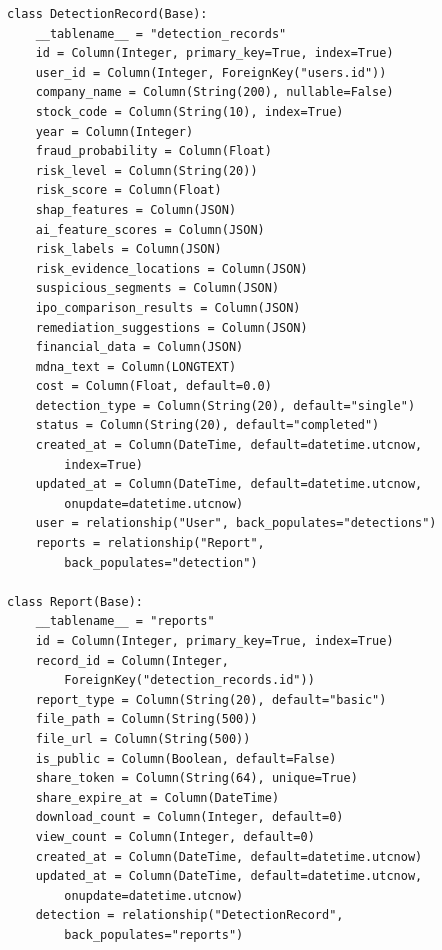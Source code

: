 \documentclass[a4paper,10pt]{article}
\begin{document}
\begin{lstlisting}
class DetectionRecord(Base):
    __tablename__ = "detection_records"
    id = Column(Integer, primary_key=True, index=True)
    user_id = Column(Integer, ForeignKey("users.id"))
    company_name = Column(String(200), nullable=False)
    stock_code = Column(String(10), index=True)
    year = Column(Integer)
    fraud_probability = Column(Float)
    risk_level = Column(String(20))
    risk_score = Column(Float)
    shap_features = Column(JSON)
    ai_feature_scores = Column(JSON)
    risk_labels = Column(JSON)
    risk_evidence_locations = Column(JSON)
    suspicious_segments = Column(JSON)
    ipo_comparison_results = Column(JSON)
    remediation_suggestions = Column(JSON)
    financial_data = Column(JSON)
    mdna_text = Column(LONGTEXT)
    cost = Column(Float, default=0.0)
    detection_type = Column(String(20), default="single")
    status = Column(String(20), default="completed")
    created_at = Column(DateTime, default=datetime.utcnow,
        index=True)
    updated_at = Column(DateTime, default=datetime.utcnow,
        onupdate=datetime.utcnow)
    user = relationship("User", back_populates="detections")
    reports = relationship("Report",
        back_populates="detection")

class Report(Base):
    __tablename__ = "reports"
    id = Column(Integer, primary_key=True, index=True)
    record_id = Column(Integer,
        ForeignKey("detection_records.id"))
    report_type = Column(String(20), default="basic")
    file_path = Column(String(500))
    file_url = Column(String(500))
    is_public = Column(Boolean, default=False)
    share_token = Column(String(64), unique=True)
    share_expire_at = Column(DateTime)
    download_count = Column(Integer, default=0)
    view_count = Column(Integer, default=0)
    created_at = Column(DateTime, default=datetime.utcnow)
    updated_at = Column(DateTime, default=datetime.utcnow,
        onupdate=datetime.utcnow)
    detection = relationship("DetectionRecord",
        back_populates="reports")
\end{lstlisting}
\end{document}
